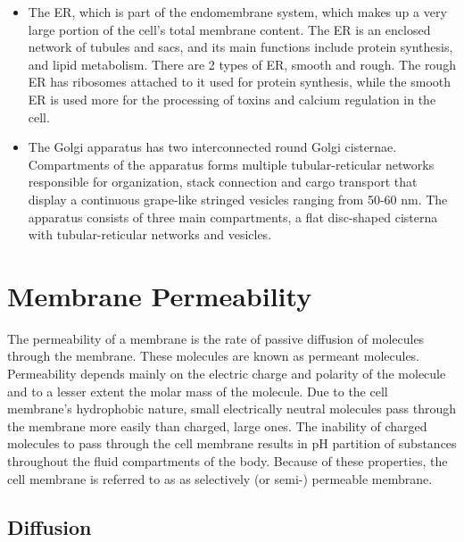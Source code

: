 \documentclass[
]{book}
\begin{document}
\begin{itemize}
\item
  The ER, which is part of the endomembrane system, which makes up a very large portion of the cell's total membrane content. The ER is an enclosed network of tubules and sacs, and its main functions include protein synthesis, and lipid metabolism. There are 2 types of ER, smooth and rough. The rough ER has ribosomes attached to it used for protein synthesis, while the smooth ER is used more for the processing of toxins and calcium regulation in the cell.
\item
  The Golgi apparatus has two interconnected round Golgi cisternae. Compartments of the apparatus forms multiple tubular-reticular networks responsible for organization, stack connection and cargo transport that display a continuous grape-like stringed vesicles ranging from 50-60 nm. The apparatus consists of three main compartments, a flat disc-shaped cisterna with tubular-reticular networks and vesicles.
\end{itemize}

\hypertarget{membrane-permeability}{%
\section{Membrane Permeability}\label{membrane-permeability}}

The permeability of a membrane is the rate of passive diffusion of molecules through the membrane. These molecules are known as permeant molecules. Permeability depends mainly on the electric charge and polarity of the molecule and to a lesser extent the molar mass of the molecule. Due to the cell membrane's hydrophobic nature, small electrically neutral molecules pass through the membrane more easily than charged, large ones. The inability of charged molecules to pass through the cell membrane results in pH partition of substances throughout the fluid compartments of the body. Because of these properties, the cell membrane is referred to as as selectively (or semi-) permeable membrane.

\hypertarget{diffusion}{%
\subsection{Diffusion}\label{diffusion}}
\end{document}
